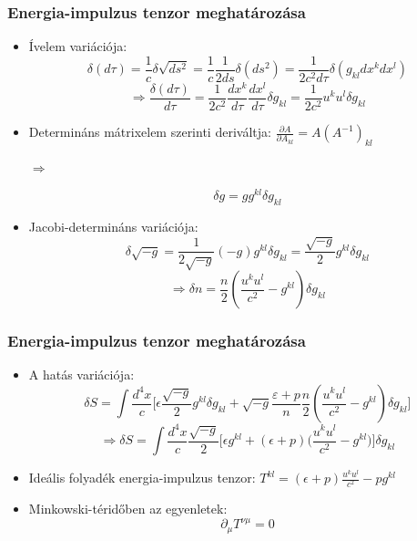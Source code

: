 \documentclass{beamer}
\begin{document}
\begin{frame}
\frametitle{Energia-impulzus tenzor meghatározása}
\begin{itemize}
\item Ívelem variációja:
\begin{equation*}
\delta(d\tau)=\frac{1}{c}\delta\sqrt{ds^2}=\frac{1}{c}\frac{1}{2ds}\delta(ds^2)=\frac{1}{2c^2 d\tau}\delta(g_{kl}dx^kdx^l)
\end{equation*}
\begin{equation*}
\Rightarrow \frac{\delta(d\tau)}{d\tau}=\frac{1}{2c^2}\frac{dx^k}{d\tau}\frac{dx^l}{d\tau}\delta g_{kl}=\frac{1}{2c^2}u^ku^l\delta g_{kl}
\end{equation*}

\item Determináns mátrixelem szerinti deriváltja: $\frac{\partial A}{\partial A_{kl}}=A(A^{-1})_{kl}$
 \begin{large}$\Rightarrow$\end{large}
\begin{equation*}
\delta g = g g^{kl}\delta g_{kl}
\end{equation*}

\item Jacobi-determináns variációja:
\begin{equation*}
\delta \sqrt{-g}=\frac{1}{2\sqrt{-g}}(-g)g^{kl}\delta g_{kl}=\frac{\sqrt{-g}}{2}g^{kl}\delta g_{kl}
\end{equation*}
\begin{equation*}
\Rightarrow \delta n=\frac{n}{2}(\frac{u^ku^l}{c^2}-g^{kl})\delta g_{kl}
\end{equation*}
\end{itemize}

\end{frame}

\begin{frame}
\frametitle{Energia-impulzus tenzor meghatározása}
\begin{itemize}
\item A hatás variációja:
\begin{equation*}
\delta S=\int \frac{d^4 x}{c}\bigg[\epsilon\frac{\sqrt{-g}}{2}g^{kl}\delta g_{kl}+\sqrt{-g}\frac{\varepsilon+p}{n}\frac{n}{2}(\frac{u^ku^l}{c^2}-g^{kl})\delta g_{kl}\bigg]
\end{equation*}
\begin{equation*}
\Rightarrow\delta S=\int \frac{d^4 x}{c}\frac{\sqrt{-g}}{2}\bigg[\epsilon g^{kl}+(\epsilon+p)\bigg(\frac{u^ku^l}{c^2}-g^{kl}\bigg)\bigg]\delta g_{kl}
\end{equation*}
\item Ideális folyadék energia-impulzus tenzor: $T^{kl}=(\epsilon+p)\frac{u^ku^l}{c^2}-pg^{kl}$
\item Minkowski-téridőben az egyenletek:
\begin{equation*}
\partial_{\mu}T^{\nu\mu}=0
\end{equation*}
\end{itemize}

\end{frame}
\end{document}
